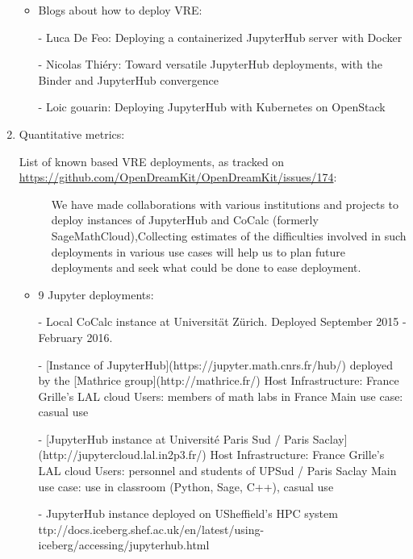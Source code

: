 \begin{enumerate}
\begin{itemize}
\item Blogs about how to deploy VRE:
\item[-] Luca De Feo: Deploying a containerized JupyterHub server with Docker %
\item[-]Nicolas Thiéry: Toward versatile JupyterHub deployments, with the Binder and JupyterHub convergence %
\item[-]Loic gouarin: Deploying JupyterHub with Kubernetes on OpenStack %
  \end{itemize}
  
\item Quantitative metrics:
\begin{description}
\item[List of known \ODK based VRE deployments, as tracked on \url{https://github.com/OpenDreamKit/OpenDreamKit/issues/174}:] We have made 
collaborations with various institutions and projects to deploy instances of JupyterHub and CoCalc (formerly SageMathCloud),Collecting 
estimates of the difficulties involved in such deployments in various use cases will help us to plan future 
deployments and seek what could be done to ease deployment.
\end{description}
\begin{itemize}
\item 9 Jupyter deployments:%

\item[-]Local CoCalc instance at Universität Zürich. Deployed September 2015 - February 2016.

\item[-][Instance of JupyterHub](https://jupyter.math.cnrs.fr/hub/) deployed by the [Mathrice group](http://mathrice.fr/)
Host Infrastructure: France Grille's LAL cloud
Users: members of math labs in France
Main use case: casual use 

\item[-][JupyterHub instance at Université Paris Sud / Paris Saclay](http://jupytercloud.lal.in2p3.fr/)
Host Infrastructure: France Grille's LAL cloud
Users: personnel and students of UPSud / Paris Saclay
Main use case: use in classroom (Python, Sage, C++), casual use
 
\item[-]JupyterHub instance deployed on USheffield's HPC system ttp://docs.iceberg.shef.ac.uk/en/latest/using-iceberg/accessing/jupyterhub.html
 

\end{itemize}
\end{enumerate}
